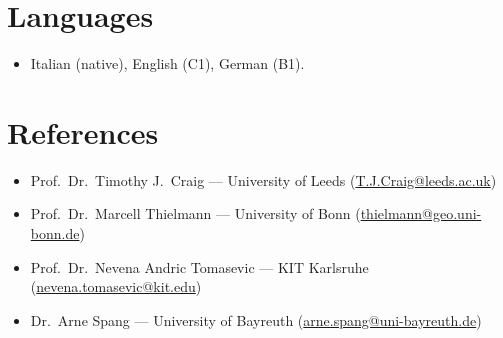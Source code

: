 \documentclass[11pt,a4paper,sans]{moderncv}
\begin{document}

\section{Languages}
\vspace{1pt}
\begin{itemize}
\item Italian (native), English (C1), German (B1).
\end{itemize}


\section{References}
\vspace{1pt}
\begin{itemize}
\item Prof.\ Dr.\ Timothy J.\ Craig --- University of Leeds (\href{mailto:T.J.Craig@leeds.ac.uk}{T.J.Craig@leeds.ac.uk})
\item Prof.\ Dr.\ Marcell Thielmann --- University of Bonn (\href{mailto:thielmann@geo.uni-bonn.de}{thielmann@geo.uni-bonn.de})
\item Prof.\ Dr.\ Nevena Andric Tomasevic --- KIT Karlsruhe (\href{mailto:nevena.tomasevic@kit.edu}{nevena.tomasevic@kit.edu})
\item Dr.\ Arne Spang --- University of Bayreuth (\href{mailto:arne.spang@uni-bayreuth.de}{arne.spang@uni-bayreuth.de})
\end{itemize}
\end{document}
